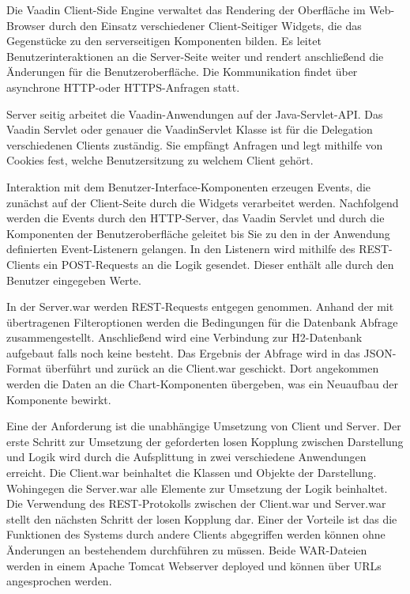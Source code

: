 Die Vaadin Client-Side Engine verwaltet das Rendering der Oberfläche im Web-Browser durch den Einsatz verschiedener Client-Seitiger Widgets, die das Gegenstücke zu den serverseitigen Komponenten bilden. Es leitet Benutzerinteraktionen an die Server-Seite weiter und rendert anschließend die Änderungen für die Benutzeroberfläche. Die Kommunikation findet über asynchrone HTTP-oder HTTPS-Anfragen statt.

Server seitig arbeitet die Vaadin-Anwendungen auf der Java-Servlet-API. Das Vaadin Servlet oder genauer die VaadinServlet Klasse ist für die Delegation verschiedenen Clients zuständig. Sie empfängt Anfragen und legt mithilfe von Cookies fest, welche Benutzersitzung zu welchem Client gehört.

Interaktion mit dem Benutzer-Interface-Komponenten erzeugen Events, die zunächst auf der Client-Seite durch die Widgets verarbeitet werden. Nachfolgend werden die Events durch den HTTP-Server, das Vaadin Servlet und durch die Komponenten der Benutzeroberfläche geleitet bis Sie zu den in der Anwendung definierten Event-Listenern gelangen. In den Listenern wird mithilfe des REST-Clients ein POST-Requests an die Logik gesendet. Dieser enthält alle durch den Benutzer eingegeben Werte. 

In der Server.war werden REST-Requests entgegen genommen. Anhand der mit übertragenen Filteroptionen werden die Bedingungen für die Datenbank Abfrage zusammengestellt. Anschließend wird eine Verbindung zur H2-Datenbank aufgebaut falls noch keine besteht. Das Ergebnis der Abfrage wird in das JSON-Format überführt und zurück an die Client.war geschickt. Dort angekommen werden die Daten an die Chart-Komponenten übergeben, was ein Neuaufbau der Komponente bewirkt.      

Eine der Anforderung ist die unabhängige Umsetzung von Client und Server. Der erste Schritt zur Umsetzung der geforderten losen Kopplung zwischen Darstellung und Logik wird durch die Aufsplittung in zwei verschiedene Anwendungen erreicht. Die Client.war beinhaltet die Klassen und Objekte der Darstellung. Wohingegen die Server.war alle Elemente zur Umsetzung der Logik beinhaltet. Die Verwendung des REST-Protokolls zwischen der Client.war und Server.war stellt den nächsten Schritt der losen Kopplung dar. Einer der Vorteile ist das die Funktionen des Systems durch andere Clients abgegriffen werden können ohne Änderungen an bestehendem durchführen zu müssen. Beide WAR-Dateien werden in einem Apache Tomcat Webserver deployed und können über URLs angesprochen werden.

